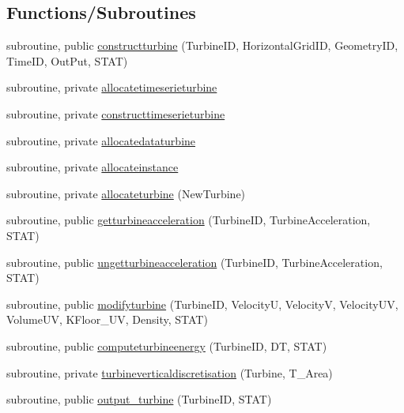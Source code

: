 \subsection*{Functions/\+Subroutines}
\begin{DoxyCompactItemize}
\item 
subroutine, public \mbox{\hyperlink{namespacemoduleturbine_aa2c0679550365b9b4e3258a1d4a155cf}{constructturbine}} (Turbine\+ID, Horizontal\+Grid\+ID, Geometry\+ID, Time\+ID, Out\+Put, S\+T\+AT)
\item 
subroutine, private \mbox{\hyperlink{namespacemoduleturbine_aed8d3d353e62537ef1a5c8225de8339a}{allocatetimeserieturbine}}
\item 
subroutine, private \mbox{\hyperlink{namespacemoduleturbine_a9771605ad11401e5f01589b0db35b8f2}{constructtimeserieturbine}}
\item 
subroutine, private \mbox{\hyperlink{namespacemoduleturbine_a7059f998720fdb2216b49dcc732d5d14}{allocatedataturbine}}
\item 
subroutine, private \mbox{\hyperlink{namespacemoduleturbine_ae9c4617b28df25e1f4b06eb1ae1051e4}{allocateinstance}}
\item 
subroutine, private \mbox{\hyperlink{namespacemoduleturbine_a256dbbfda7b4fd109ab1088e055e3bd0}{allocateturbine}} (New\+Turbine)
\item 
subroutine, public \mbox{\hyperlink{namespacemoduleturbine_a5ce2cf1858c4b390f22dc2451c692f3c}{getturbineacceleration}} (Turbine\+ID, Turbine\+Acceleration, S\+T\+AT)
\item 
subroutine, public \mbox{\hyperlink{namespacemoduleturbine_ac345708176716a36f768cfd878d6a6b0}{ungetturbineacceleration}} (Turbine\+ID, Turbine\+Acceleration, S\+T\+AT)
\item 
subroutine, public \mbox{\hyperlink{namespacemoduleturbine_a91250e475b9a5222abdd834b760515c6}{modifyturbine}} (Turbine\+ID, VelocityU, VelocityV, Velocity\+UV, Volume\+UV, K\+Floor\+\_\+\+UV, Density, S\+T\+AT)
\item 
subroutine, public \mbox{\hyperlink{namespacemoduleturbine_a35c07aae7c495f5bff14bf45e5811a6e}{computeturbineenergy}} (Turbine\+ID, DT, S\+T\+AT)
\item 
subroutine, private \mbox{\hyperlink{namespacemoduleturbine_a796f4418d909ff969c2d9169148e3414}{turbineverticaldiscretisation}} (Turbine, T\+\_\+\+Area)
\item 
subroutine, public \mbox{\hyperlink{namespacemoduleturbine_ab12d2233fd93cc941831900a0b5713c9}{output\+\_\+turbine}} (Turbine\+ID, S\+T\+AT)

\end{DoxyCompactItemize}
